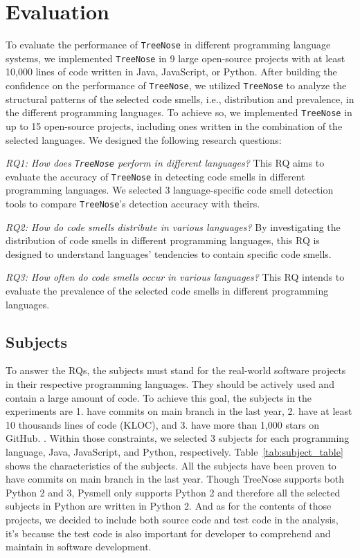 

\section{Evaluation}
\label{sec:evaluation}

To evaluate the performance of \texttt{TreeNose} in different programming language systems,
we implemented \texttt{TreeNose} in 9 large open-source projects with at least 10,000 lines of code written in Java, JavaScript, or
Python. After building the confidence on the performance of \texttt{TreeNose}, we utilized \texttt{TreeNose} to analyze the structural patterns
of the selected code smells, i.e., distribution and prevalence, in the different programming languages. To achieve so, we implemented \texttt{TreeNose} in up to 15 open-source projects, including
ones written in the combination of the selected languages. We designed the following research questions:

{\it RQ1: How does \texttt{TreeNose} perform in different languages?}
This RQ aims to evaluate the accuracy of \texttt{TreeNose} in detecting code smells in different programming languages. 
We selected 3 language-specific code smell detection tools to compare \texttt{TreeNose}'s detection accuracy with theirs.

{\it RQ2: How do code smells distribute in various languages?}
By investigating the distribution of code smells in different programming languages, this RQ is designed to understand 
languages' tendencies to contain specific code smells.

{\it RQ3: How often do code smells occur in various languages?}
This RQ intends to evaluate the prevalence of the selected code smells in different programming languages.

\subsection{Subjects}
\label{sec:subjects}

To answer the RQs, the subjects must stand for the real-world software projects in their respective 
programming languages. They should be actively used and contain a large amount of code. To achieve this goal, the subjects in the 
experiments are 1. have commits on main branch in the last year, 2. have at least 10 thousands lines of code (KLOC), and 3. have more than 1,000 stars on GitHub.
. Within those constraints, we selected 3 subjects for each programming language, Java, JavaScript, and Python, respectively.
Table~\ref{tab:subject_table} shows the characteristics of the subjects. All the subjects have been proven to have commits on main branch in the last year.
Though TreeNose supports both Python 2 and 3, Pysmell only supports Python 2 and therefore all the selected subjects in Python are written in Python 2.
And as for the contents of those projects, we decided to include both source code and test code in the analysis, 
it's because the test code is also important for developer to comprehend and maintain in software development.

